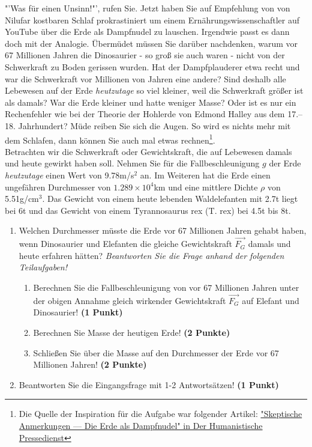 \documentclass[a4paper, 9pt]{scrartcl}\usepackage[]{graphicx}\usepackage[]{xcolor}
\begin{document}
"'Was für einen Unsinn!"', rufen Sie. Jetzt haben Sie auf Empfehlung von von Nilufar kostbaren Schlaf prokrastiniert um einem Ernährungswissenschaftler auf YouTube über die Erde als Dampfnudel zu lauschen. Irgendwie passt es dann doch mit der Analogie. Übermüdet müssen Sie darüber nachdenken, warum vor 67 Millionen Jahren die Dinosaurier - so groß sie auch waren - nicht von der Schwerkraft zu Boden gerissen wurden. Hat der Dampfplauderer etwa recht und war die Schwerkraft vor Millionen von Jahren eine andere?  Sind deshalb alle Lebewesen auf der Erde \textit{heutzutage} so viel kleiner, weil die Schwerkraft größer ist als damals? War die Erde kleiner und hatte weniger Masse? Oder ist es nur ein Rechenfehler wie bei der Theorie der Hohlerde von Edmond Halley aus dem 17.–18. Jahrhundert? Müde reiben Sie sich die Augen. So wird es nichts mehr mit dem Schlafen, dann können Sie auch mal etwas rechnen\footnote{Die Quelle der Inspiration
  für die Aufgabe war folgender Artikel:
  \href{https://hpd.de/artikel/erde-dampfnudel-22236}{"Skeptische Anmerkungen --- Die Erde als Dampfnudel" in Der Humanistische Pressedienst}}.  \\

Betrachten wir die Schwerkraft oder Gewichtskraft, die auf Lebewesen damals und heute gewirkt haben soll. Nehmen Sie für die Fallbeschleunigung $g$ der Erde \textit{heutzutage} einen Wert von 9.78m/s$^2$ an. Im Weiteren hat die Erde einen ungefähren Durchmesser von \ensuremath{1.289\times 10^{4}}km und eine mittlere Dichte $\rho$ von 5.51g/cm$^3$. Das Gewicht von einem heute lebenden Waldelefanten mit 2.7t liegt bei 6t und das Gewicht von einem Tyrannosaurus rex (T. rex) bei 4.5t bis 8t.

\begin{enumerate}
\item Welchen Durchmesser müsste die Erde vor 67 Millionen Jahren gehabt haben, wenn Dinosaurier und Elefanten die gleiche Gewichtskraft $\overrightarrow{F_G}$ damals und heute erfahren hätten? \textit{Beantworten Sie die Frage anhand der folgenden Teilaufgaben!}
\begin{enumerate}
\item Berechnen Sie die Fallbeschleunigung von vor 67 Millionen Jahren unter der obigen Annahme gleich wirkender Gewichtskraft $\overrightarrow{F_G}$ auf Elefant und Dinosaurier! \textbf{(1 Punkt)}
\item Berechnen Sie Masse der heutigen Erde! \textbf{(2 Punkte)}
\item Schließen Sie über die Masse auf den Durchmesser der Erde vor 67 Millionen Jahren! \textbf{(2 Punkte)}
\end{enumerate}
\item Beantworten Sie die Eingangsfrage mit 1-2 Antwortsätzen! \textbf{(1 Punkt)}
\end{enumerate}
\end{document}
